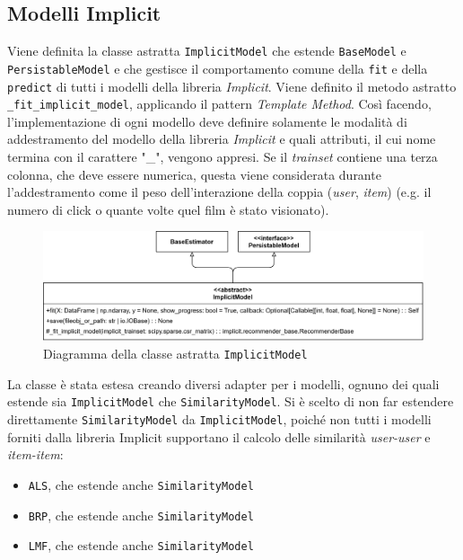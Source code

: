 \newpage

\subsection{Modelli Implicit}

Viene definita la classe astratta \texttt{ImplicitModel} che estende \texttt{BaseModel} e \\ \texttt{PersistableModel} e che gestisce il comportamento comune della \texttt{fit} e della \texttt{predict} di tutti i modelli della libreria \textit{Implicit}. Viene definito il metodo astratto \texttt{\_fit\_implicit\_model}, applicando il pattern \textit{Template Method}. Così facendo, l'implementazione di ogni modello deve definire solamente le modalità di addestramento del modello della libreria \textit{Implicit} e quali attributi, il cui nome termina con il carattere "\_", vengono appresi. Se il \textit{trainset} contiene una terza colonna, che deve essere numerica, questa viene considerata durante l'addestramento come il peso dell'interazione della coppia (\textit{user}, \textit{item}) (e.g. il numero di click o quante volte quel film è stato visionato). 

\begin{figure}[htbp]
    \centering
    \includegraphics[scale=0.15]{figures/UML/models/implicit_model.png}
    \caption{Diagramma della classe astratta \texttt{ImplicitModel}}
\end{figure}

La classe è stata estesa creando diversi adapter per i modelli, ognuno dei quali estende sia \texttt{ImplicitModel} che \texttt{SimilarityModel}. Si è scelto di non far estendere direttamente \texttt{SimilarityModel} da \texttt{ImplicitModel}, poiché non tutti i modelli forniti dalla libreria Implicit supportano il calcolo delle similarità \textit{user-user} e \textit{item-item}:

\begin{itemize}
    \item \texttt{ALS}, che estende anche \texttt{SimilarityModel}
    \item \texttt{BRP}, che estende anche \texttt{SimilarityModel}
    \item \texttt{LMF}, che estende anche \texttt{SimilarityModel}
\end{itemize}

